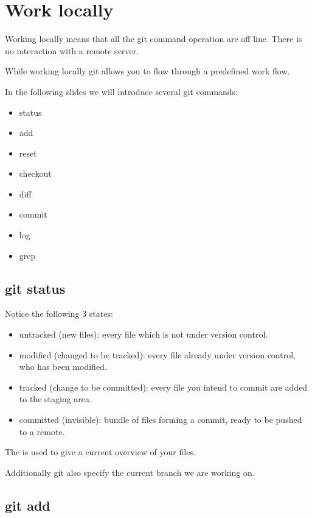 \section{Work locally}
\begin{frame}[fragile]
    \slidetitle

Working locally means that all the git command operation are off line.
There is no interaction with a remote server.

While working locally git allows you to flow through a predefined work flow.


In the following slides we will introduce several git commands:
\begin{itemize}
\item status
\item add
\item reset
\item checkout
\item diff
\item commit
\item log
\item grep
\end{itemize}
\end{frame}

\subsection{git status}
\begin{frame}[fragile]
    \subslidetitle
Notice the following 3 states:
\begin{itemize}
\item untracked (new files): every file which is not under version control.
\item modified (changed to be tracked): every file already under version control, who has been modified.
\item tracked (change to be committed): every file you intend to commit are added to the staging area.
\item committed (invisible): bundle of files forming a commit, ready to be pushed to a remote.
\end{itemize}

The  is used to give a current overview of your files.

Additionally git also specify the current branch we are working on.
\end{frame}

\subsection{git add}
\begin{frame}[fragile]
    \subslidetitle
\end{frame}


